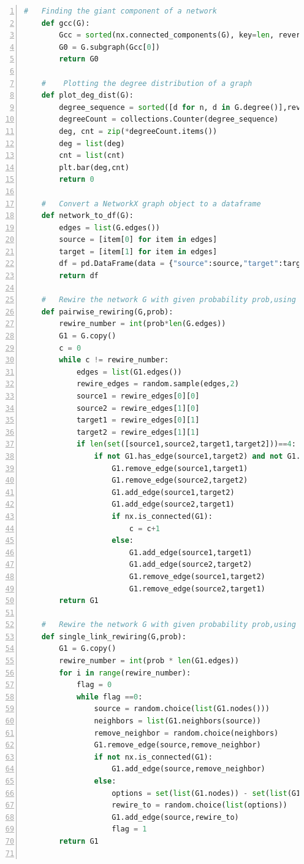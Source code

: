 \documentclass[12pt]{article}
\begin{document}
\begin{lstlisting}[numbers=left,language=Python,breaklines=true]
    #   Finding the giant component of a network
    def gcc(G):
        Gcc = sorted(nx.connected_components(G), key=len, reverse=True)
        G0 = G.subgraph(Gcc[0])
        return G0
    
    #    Plotting the degree distribution of a graph
    def plot_deg_dist(G):
        degree_sequence = sorted([d for n, d in G.degree()],reverse = True)
        degreeCount = collections.Counter(degree_sequence)
        deg, cnt = zip(*degreeCount.items())
        deg = list(deg)
        cnt = list(cnt)
        plt.bar(deg,cnt)
        return 0
    
    #   Convert a NetworkX graph object to a dataframe
    def network_to_df(G):
        edges = list(G.edges())
        source = [item[0] for item in edges]
        target = [item[1] for item in edges]
        df = pd.DataFrame(data = {"source":source,"target":target})
        return df
    
    #   Rewire the network G with given probability prob,using pairwise rewiring
    def pairwise_rewiring(G,prob):
        rewire_number = int(prob*len(G.edges))
        G1 = G.copy()
        c = 0 
        while c != rewire_number:
            edges = list(G1.edges())
            rewire_edges = random.sample(edges,2)
            source1 = rewire_edges[0][0]
            source2 = rewire_edges[1][0]
            target1 = rewire_edges[0][1]
            target2 = rewire_edges[1][1]
            if len(set([source1,source2,target1,target2]))==4:
                if not G1.has_edge(source1,target2) and not G1.has_edge(source2,target1):
                    G1.remove_edge(source1,target1)
                    G1.remove_edge(source2,target2)
                    G1.add_edge(source1,target2)
                    G1.add_edge(source2,target1)
                    if nx.is_connected(G1):
                        c = c+1
                    else:
                        G1.add_edge(source1,target1)
                        G1.add_edge(source2,target2)
                        G1.remove_edge(source1,target2)
                        G1.remove_edge(source2,target1)
        return G1
    
    #   Rewire the network G with given probability prob,using single link rewiring
    def single_link_rewiring(G,prob):
        G1 = G.copy()
        rewire_number = int(prob * len(G1.edges))
        for i in range(rewire_number):
            flag = 0
            while flag ==0:
                source = random.choice(list(G1.nodes()))
                neighbors = list(G1.neighbors(source))
                remove_neighbor = random.choice(neighbors)
                G1.remove_edge(source,remove_neighbor)
                if not nx.is_connected(G1):
                    G1.add_edge(source,remove_neighbor)
                else:
                    options = set(list(G1.nodes)) - set(list(G1.neighbors(source)))-set([source,remove_neighbor])
                    rewire_to = random.choice(list(options))
                    G1.add_edge(source,rewire_to)
                    flag = 1
        return G1
    

\end{lstlisting}
\end{document}
